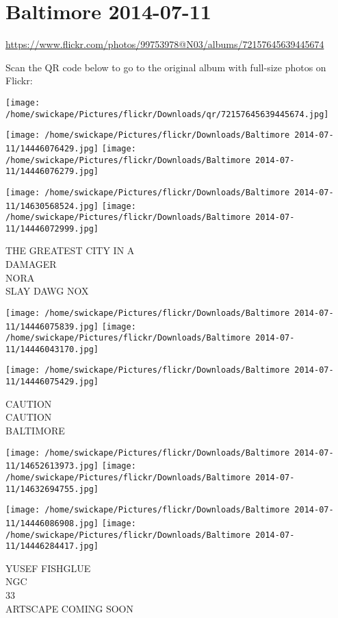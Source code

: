 \documentclass[10pt,letterpaper]{article}
\title{}
\author{}
\date{}
\begin{document}
\section*{Baltimore 2014-07-11}

\url{https://www.flickr.com/photos/99753978@N03/albums/72157645639445674}

Scan the QR code below to go to the original album with full-size photos on Flickr:

\texttt{[image: /home/swickape/Pictures/flickr/Downloads/qr/72157645639445674.jpg]}
\pagebreak

\texttt{[image: /home/swickape/Pictures/flickr/Downloads/Baltimore 2014-07-11/14446076429.jpg]}
\texttt{[image: /home/swickape/Pictures/flickr/Downloads/Baltimore 2014-07-11/14446076279.jpg]}

\texttt{[image: /home/swickape/Pictures/flickr/Downloads/Baltimore 2014-07-11/14630568524.jpg]}
\texttt{[image: /home/swickape/Pictures/flickr/Downloads/Baltimore 2014-07-11/14446072999.jpg]}

THE GREATEST CITY IN A\\
DAMAGER\\
NORA\\
SLAY DAWG NOX
\pagebreak

\texttt{[image: /home/swickape/Pictures/flickr/Downloads/Baltimore 2014-07-11/14446075839.jpg]}
\texttt{[image: /home/swickape/Pictures/flickr/Downloads/Baltimore 2014-07-11/14446043170.jpg]}

\vspace{0.25in}
\texttt{[image: /home/swickape/Pictures/flickr/Downloads/Baltimore 2014-07-11/14446075429.jpg]}

CAUTION\\
CAUTION\\
BALTIMORE
\pagebreak

\texttt{[image: /home/swickape/Pictures/flickr/Downloads/Baltimore 2014-07-11/14652613973.jpg]}
\texttt{[image: /home/swickape/Pictures/flickr/Downloads/Baltimore 2014-07-11/14632694755.jpg]}

\texttt{[image: /home/swickape/Pictures/flickr/Downloads/Baltimore 2014-07-11/14446086908.jpg]}
\texttt{[image: /home/swickape/Pictures/flickr/Downloads/Baltimore 2014-07-11/14446284417.jpg]}

YUSEF FISHGLUE\\
NGC\\
33\\
ARTSCAPE COMING SOON
\pagebreak
\end{document}
